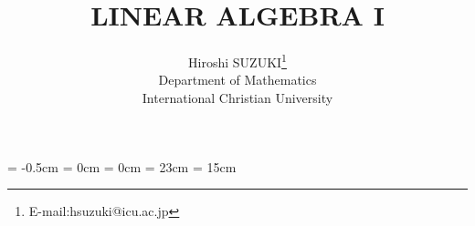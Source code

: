 
\topmargin = -0.5cm
\oddsidemargin = 0cm \evensidemargin = 0cm
\textheight = 23cm \textwidth = 15cm %

\title{LINEAR ALGEBRA I}
      
\author{Hiroshi SUZUKI\thanks{E-mail:hsuzuki@icu.ac.jp}\\ 
        Department of Mathematics \\ 
        International Christian University}

\renewcommand{\thepage}{%
        \arabic{section}--\arabic{page}}
\newcommand{\mysection}[1]{%
        \section{#1}\setcounter{page}{1}}

